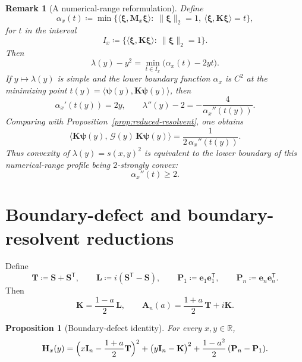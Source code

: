 \documentclass[11pt]{article}
\newtheorem{proposition}[theorem]{Proposition}
\newtheorem{remark}[theorem]{Remark}
\begin{document}
\begin{remark}[A numerical-range reformulation]\label{rem:numerical-range}
Define
\[
\alpha_x(t)\coloneqq
\min\bigl\{
\langle \boldsymbol{\xi},\mathbf M_x\boldsymbol{\xi}\rangle:\;
\|\boldsymbol{\xi}\|_2=1,\ \langle \boldsymbol{\xi},\mathbf K\boldsymbol{\xi}\rangle=t
\bigr\},
\]
for \(t\) in the interval
\[
I_x\coloneqq \{\langle \boldsymbol{\xi},\mathbf K\boldsymbol{\xi}\rangle:\ \|\boldsymbol{\xi}\|_2=1\}.
\]
Then
\[
\lambda(y)-y^2
=
\min_{t\in I_x}\bigl(\alpha_x(t)-2yt\bigr).
\]
If \(y\mapsto \lambda(y)\) is simple and the lower boundary function \(\alpha_x\) is \(C^2\) at the minimizing point \(t(y)=\langle \boldsymbol{\psi}(y),\mathbf K\boldsymbol{\psi}(y)\rangle\), then
\[
\alpha_x'(t(y))=2y,
\qquad
\lambda''(y)-2=-\frac{4}{\alpha_x''(t(y))}.
\]
Comparing with Proposition~\ref{prop:reduced-resolvent}, one obtains
\[
\bigl\langle \mathbf K\boldsymbol{\psi}(y),\,\mathcal G(y)\,\mathbf K\boldsymbol{\psi}(y)\bigr\rangle
=
\frac{1}{2\,\alpha_x''(t(y))}.
\]
Thus convexity of \(\lambda(y)=s(x,y)^2\) is equivalent to the lower boundary of this numerical-range profile being \(2\)-strongly convex:
\[
\alpha_x''(t)\ge 2.
\]
\end{remark}

\section{Boundary-defect and boundary-resolvent reductions}

Define
\[
\mathbf T\coloneqq \mathbf S+\mathbf S^{\mathsf T},
\qquad
\mathbf L\coloneqq i(\mathbf S^{\mathsf T}-\mathbf S),
\qquad
\mathbf P_1\coloneqq \mathbf e_1\mathbf e_1^{\mathsf T},
\qquad
\mathbf P_n\coloneqq \mathbf e_n\mathbf e_n^{\mathsf T}.
\]
Then
\[
\mathbf K=\frac{1-a}{2}\,\mathbf L,
\qquad
\mathbf A_n(a)=\frac{1+a}{2}\,\mathbf T+i\mathbf K.
\]

\begin{proposition}[Boundary-defect identity]\label{prop:boundary-defect}
For every \(x,y\in\mathbb R\),
\[
\mathbf H_x(y)
=
\Bigl(x\mathbf I_n-\frac{1+a}{2}\mathbf T\Bigr)^2
+
\bigl(y\mathbf I_n-\mathbf K\bigr)^2
+
\frac{1-a^2}{2}\,(\mathbf P_n-\mathbf P_1).
\]
\end{proposition}
\end{document}
